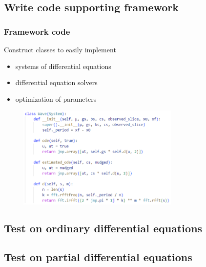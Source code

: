 \documentclass{beamer}
\begin{document}
\subsection{Write code supporting framework}

\begin{frame}
  \frametitle{Framework code}
  Construct classes to easily implement
  \begin{itemize}[label=\checkmark]
    \item<1-> systems of differential equations
    \item<2-> differential equation solvers
    \item<3-> optimization of parameters
  \end{itemize}
  \pause
  \pause
  \pause

  \begin{figure}
    \centering
    \includegraphics[height=2in, keepaspectratio]{wave_1d_code.png}
  \end{figure}
\end{frame}

\subsection{Test on ordinary differential equations}

\subsection{Test on partial differential equations}
\end{document}
